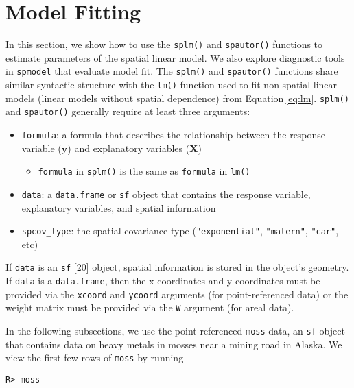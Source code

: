 \documentclass[10pt,letterpaper]{article}
\providecommand{\tightlist}{%
  \setlength{\itemsep}{0pt}\setlength{\parskip}{0pt}}
\begin{document}
\hypertarget{sec:modelfit}{%
\section{Model Fitting}\label{sec:modelfit}}

In this section, we show how to use the \texttt{splm()} and
\texttt{spautor()} functions to estimate parameters of the spatial
linear model. We also explore diagnostic tools in \texttt{spmodel} that
evaluate model fit. The \texttt{splm()} and \texttt{spautor()} functions
share similar syntactic structure with the \texttt{lm()} function used
to fit non-spatial linear models (linear models without spatial
dependence) from Equation\(~\)\ref{eq:lm}. \texttt{splm()} and
\texttt{spautor()} generally require at least three arguments:

\begin{itemize}
\tightlist
\item
  \texttt{formula}: a formula that describes the relationship between
  the response variable (\(\mathbf{y}\)) and explanatory variables
  (\(\mathbf{X}\))

  \begin{itemize}
  \tightlist
  \item
    \texttt{formula} in \texttt{splm()} is the same as \texttt{formula}
    in \texttt{lm()}
  \end{itemize}
\item
  \texttt{data}: a \texttt{data.frame} or \texttt{sf} object that
  contains the response variable, explanatory variables, and spatial
  information
\item
  \texttt{spcov\_type}: the spatial covariance type
  (\texttt{"exponential"}, \texttt{"matern"}, \texttt{"car"}, etc)
\end{itemize}

If \texttt{data} is an \texttt{sf} {[}20{]} object, spatial information
is stored in the object's geometry. If \texttt{data} is a
\texttt{data.frame}, then the x-coordinates and y-coordinates must be
provided via the \texttt{xcoord} and \texttt{ycoord} arguments (for
point-referenced data) or the weight matrix must be provided via the
\texttt{W} argument (for areal data).

In the following subsections, we use the point-referenced \texttt{moss}
data, an \texttt{sf} object that contains data on heavy metals in mosses
near a mining road in Alaska. We view the first few rows of
\texttt{moss} by running

\begin{verbatim}
R> moss
\end{verbatim}
\end{document}
